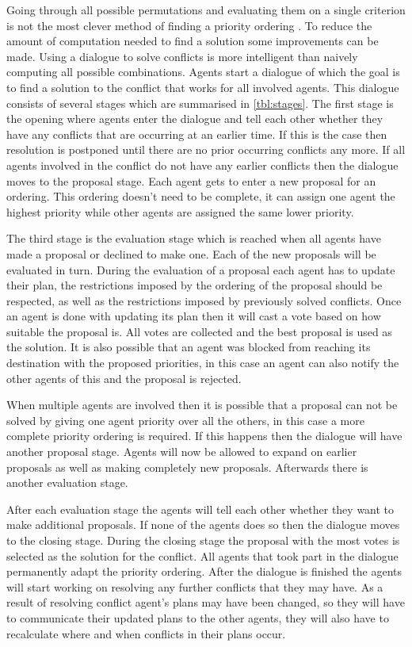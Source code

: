Going through all possible permutations and evaluating them on a single
criterion is not the most
clever method of finding a priority ordering \cite{bennewitz2002}. To reduce
the amount of computation needed to find a solution some improvements can be
made. Using a dialogue to solve conflicts is more intelligent than naively
computing all possible combinations. Agents start a dialogue of which the goal
is to find a solution to the conflict that works for all involved agents. This
dialogue consists of several stages which are summarised in
\autoref{tbl:stages}. The first stage is the opening where agents enter the
dialogue and tell each other whether they have any conflicts that are occurring
at an earlier time. If this is the case then resolution is postponed until
there are  no prior occurring conflicts any more. If all agents involved in the
conflict do not have any
earlier conflicts then the dialogue moves to the proposal stage. Each agent
gets to enter a new proposal for an ordering. This ordering doesn't need to be
complete, it can assign one agent the highest priority while other agents are
assigned the same lower priority.

The third stage is the evaluation stage which is reached when all agents have
made a proposal or declined to make one. Each of the new proposals will be
evaluated in turn. During the evaluation of a proposal each agent has to update
their plan, the restrictions imposed by the ordering of the proposal should be
respected, as well as the restrictions imposed by previously solved conflicts.
Once an
agent is done with updating its plan then it will cast a vote based on how
suitable the proposal is. All votes are collected and the best proposal is
used as the solution. It is also possible that an agent was blocked from
reaching its destination with the proposed priorities, in this case an agent
can also notify the other agents of this and the proposal is rejected.

When multiple agents are involved then it is possible that a proposal can not
be solved by giving one agent priority over all the others, in this case a more
complete priority ordering is required. If this happens then the dialogue will
have another proposal stage. Agents will now be allowed to expand on earlier
proposals as well as making completely new proposals. Afterwards there is
another evaluation stage.

After each evaluation stage the agents will tell each other whether they want
to make additional proposals. If none of the agents does so then the dialogue
moves to the closing stage. During the closing stage the proposal with the most
votes is selected as the solution for the conflict. All agents that took part
in the dialogue permanently adapt the priority ordering. After the dialogue is
finished the agents will start working on resolving any further conflicts that
they may have. As a result of resolving conflict agent's plans may have been
changed, so they will have to communicate their updated plans to the other
agents, they will also have to recalculate where and when conflicts in their
plans occur.


